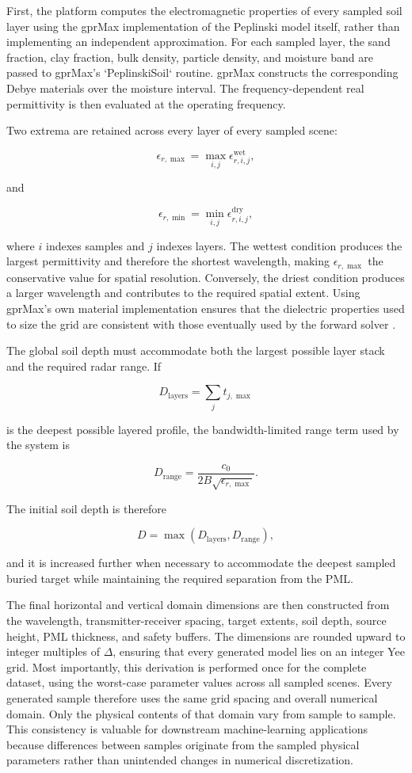 \documentclass[journal]{IEEEtran}
\begin{document}
First, the platform computes the electromagnetic properties of every sampled soil layer using the gprMax implementation of the Peplinski model itself, rather than implementing an independent approximation. For each sampled layer, the sand fraction, clay fraction, bulk density, particle density, and moisture band are passed to gprMax's `PeplinskiSoil` routine. gprMax constructs the corresponding Debye materials over the moisture interval. The frequency-dependent real permittivity is then evaluated at the operating frequency.

Two extrema are retained across every layer of every sampled scene:

$$
\epsilon_{r,\max}
=
\max_{i,j}
\epsilon_{r,i,j}^{\mathrm{wet}},
$$

and

$$
\epsilon_{r,\min}
=
\min_{i,j}
\epsilon_{r,i,j}^{\mathrm{dry}},
$$

where \(i\) indexes samples and \(j\) indexes layers. The wettest condition produces the largest permittivity and therefore the shortest wavelength, making \(\epsilon_{r,\max}\) the conservative value for spatial resolution. Conversely, the driest condition produces a larger wavelength and contributes to the required spatial extent. Using gprMax's own material implementation ensures that the dielectric properties used to size the grid are consistent with those eventually used by the forward solver \cite{warren2016gprmax}.

The global soil depth must accommodate both the largest possible layer stack and the required radar range. If

$$
D_{\mathrm{layers}}
=
\sum_j t_{j,\max}
$$

is the deepest possible layered profile, the bandwidth-limited range term used by the system is

$$
D_{\mathrm{range}}
=
\frac{c_0}
{2B\sqrt{\epsilon_{r,\max}}}.
$$

The initial soil depth is therefore

$$
D =
\max
\left(
D_{\mathrm{layers}},
D_{\mathrm{range}}
\right),
$$

and it is increased further when necessary to accommodate the deepest sampled buried target while maintaining the required separation from the PML.

The final horizontal and vertical domain dimensions are then constructed from the wavelength, transmitter-receiver spacing, target extents, soil depth, source height, PML thickness, and safety buffers. The dimensions are rounded upward to integer multiples of \(\Delta\), ensuring that every generated model lies on an integer Yee grid. Most importantly, this derivation is performed once for the complete dataset, using the worst-case parameter values across all sampled scenes. Every generated sample therefore uses the same grid spacing and overall numerical domain. Only the physical contents of that domain vary from sample to sample. This consistency is valuable for downstream machine-learning applications because differences between samples originate from the sampled physical parameters rather than unintended changes in numerical discretization.
\end{document}
